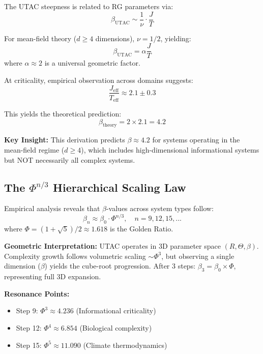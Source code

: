\documentclass[11pt,a4paper]{article}
\begin{document}
The UTAC steepness is related to RG parameters via:
\begin{equation}
\beta_{\text{UTAC}} \sim \frac{1}{\nu} \cdot \frac{J}{T}
\label{eq:beta_rg}
\end{equation}

For mean-field theory ($d \geq 4$ dimensions), $\nu = 1/2$, yielding:
\begin{equation}
\beta_{\text{UTAC}} = \alpha \frac{J}{T}
\label{eq:beta_simple}
\end{equation}
where $\alpha \approx 2$ is a universal geometric factor.

At criticality, empirical observation across domains suggests:
\begin{equation}
\frac{J_{\text{eff}}}{T_{\text{eff}}} \approx 2.1 \pm 0.3
\label{eq:jeff}
\end{equation}

This yields the theoretical prediction:
\begin{equation}
\beta_{\text{theory}} = 2 \times 2.1 = 4.2
\label{eq:beta_pred}
\end{equation}

\textbf{Key Insight:} This derivation predicts $\beta \approx 4.2$ for systems operating in the mean-field regime ($d \geq 4$), which includes high-dimensional informational systems but NOT necessarily all complex systems.

\subsection{The $\Phi^{n/3}$ Hierarchical Scaling Law}

Empirical analysis reveals that $\beta$-values across system types follow:
\begin{equation}
\beta_n \approx \beta_0 \cdot \Phi^{n/3}, \quad n = 9, 12, 15, ...
\label{eq:phi_scaling}
\end{equation}
where $\Phi = (1+\sqrt{5})/2 \approx 1.618$ is the Golden Ratio.

\textbf{Geometric Interpretation:} UTAC operates in 3D parameter space $(R, \Theta, \beta)$. Complexity growth follows volumetric scaling $\sim \Phi^3$, but observing a single dimension ($\beta$) yields the cube-root progression. After 3 steps: $\beta_3 = \beta_0 \times \Phi$, representing full 3D expansion.

\textbf{Resonance Points:}
\begin{itemize}
\item Step 9: $\Phi^3 \approx 4.236$ (Informational criticality)
\item Step 12: $\Phi^4 \approx 6.854$ (Biological complexity)
\item Step 15: $\Phi^5 \approx 11.090$ (Climate thermodynamics)
\end{itemize}
\end{document}
